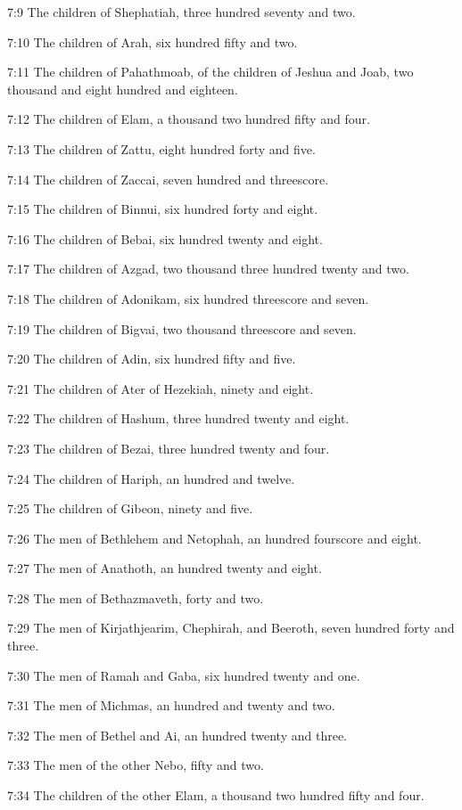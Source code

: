 7:9 The children of Shephatiah, three hundred seventy and two.

7:10 The children of Arah, six hundred fifty and two.

7:11 The children of Pahathmoab, of the children of Jeshua and Joab, two thousand and eight hundred and eighteen.

7:12 The children of Elam, a thousand two hundred fifty and four.

7:13 The children of Zattu, eight hundred forty and five.

7:14 The children of Zaccai, seven hundred and threescore.

7:15 The children of Binnui, six hundred forty and eight.

7:16 The children of Bebai, six hundred twenty and eight.

7:17 The children of Azgad, two thousand three hundred twenty and two.

7:18 The children of Adonikam, six hundred threescore and seven.

7:19 The children of Bigvai, two thousand threescore and seven.

7:20 The children of Adin, six hundred fifty and five.

7:21 The children of Ater of Hezekiah, ninety and eight.

7:22 The children of Hashum, three hundred twenty and eight.

7:23 The children of Bezai, three hundred twenty and four.

7:24 The children of Hariph, an hundred and twelve.

7:25 The children of Gibeon, ninety and five.

7:26 The men of Bethlehem and Netophah, an hundred fourscore and eight.

7:27 The men of Anathoth, an hundred twenty and eight.

7:28 The men of Bethazmaveth, forty and two.

7:29 The men of Kirjathjearim, Chephirah, and Beeroth, seven hundred forty and three.

7:30 The men of Ramah and Gaba, six hundred twenty and one.

7:31 The men of Michmas, an hundred and twenty and two.

7:32 The men of Bethel and Ai, an hundred twenty and three.

7:33 The men of the other Nebo, fifty and two.

7:34 The children of the other Elam, a thousand two hundred fifty and four.

